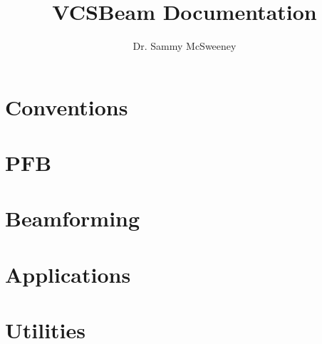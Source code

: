 \documentclass{book}
\title{VCSBeam Documentation}
\author{Dr. Sammy McSweeney}
\begin{document}
\maketitle

\tableofcontents

\chapter{Conventions}

\chapter{PFB}

\chapter{Beamforming}

\chapter{Applications}

\chapter{Utilities}
\end{document}
